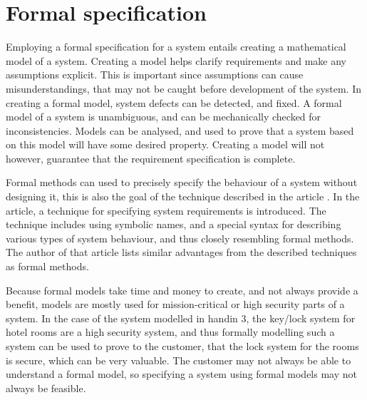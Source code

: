 \documentclass[Main]{subfiles}
\begin{document}
\section{Formal specification}

Employing a formal specification for a system entails creating a mathematical model of a system. Creating a model helps clarify requirements and make any assumptions explicit. This is important since assumptions can cause misunderstandings, that may not be caught before development of the system. In creating a formal model, system defects can be detected, and fixed. A formal model of a system is unambiguous, and can be mechanically checked for inconsistencies. Models can be analysed, and used to prove that a system based on this model will have some desired property. Creating a model will not however, guarantee that the requirement specification is complete.

Formal methods can used to precisely specify the behaviour of a system without designing it, this is also the goal of the technique described in the article \parencite[]{Specifying}. In the article, a technique for specifying system requirements is introduced. The technique includes using symbolic names, and a special syntax for describing various types of system behaviour, and thus closely resembling formal methods. The author of that article lists similar advantages from the described techniques as formal methods. 

Because formal models take time and money to create, and not always provide a benefit, models are mostly used for mission-critical or high security parts of a system. In the case of the system modelled in handin 3\parencite[1-5]{HI3}, the key/lock system for hotel rooms are a high security system, and thus formally modelling such a system can be used to prove to the customer, that the lock system for the rooms is secure, which can be very valuable. The customer may not always be able to understand a formal model, so specifying a system using formal models may not always be feasible.
\end{document}
